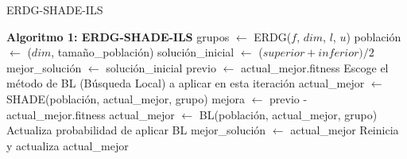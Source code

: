 \begin{algorithm}
\caption{ERDG-SHADE-ILS}
\label{ERDG-SHADE-ILS}
\begin{algorithmic}[1]
\STATE \textbf{Algoritmo 1: ERDG-SHADE-ILS}
\STATE grupos $\leftarrow$ ERDG($f$, $dim$, $l$, $u$)
\STATE población $\leftarrow$ ($dim$, tamaño\_población)
\STATE solución\_inicial $\leftarrow$ ($superior + inferior) / 2$
\STATE mejor\_solución $\leftarrow$ solución\_inicial
    \STATE previo $\leftarrow$ actual\_mejor.fitness
    \STATE Escoge el método de BL (Búsqueda Local) a aplicar en esta iteración
        \STATE actual\_mejor $\leftarrow$ SHADE(población, actual\_mejor, grupo)
        \STATE mejora $\leftarrow$ previo - actual\_mejor.fitness
        \STATE actual\_mejor $\leftarrow$ BL(población, actual\_mejor, grupo)
    \ENDFOR
    \STATE Actualiza probabilidad de aplicar BL
        \STATE mejor\_solución $\leftarrow$ actual\_mejor
    \ENDIF
        \STATE Reinicia y actualiza actual\_mejor
    \ENDIF
\ENDWHILE
\end{algorithmic}
\end{algorithm}


\endinput
